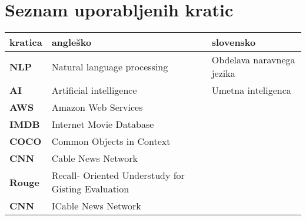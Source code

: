 \chapter*{Seznam uporabljenih kratic}
\begin{center}
\begin{tabular}{l|l|l}
  {\bf kratica} & {\bf angleško} & {\bf slovensko} \\ \hline
    {\bf NLP} & Natural language processing & Obdelava naravnega jezika\\
  {\bf AI} & Artificial intelligence & Umetna inteligenca \\
  {\bf AWS} & Amazon Web Services \\
  {\bf IMDB} & Internet Movie Database  \\
    {\bf COCO} & Common Objects in Context \\
      {\bf CNN} & Cable News Network  \\
        {\bf Rouge} & Recall- Oriented 
        Understudy for Gisting Evaluation \\
          {\bf CNN} & ICable News Network  \\
\end{tabular}
\end{center}
